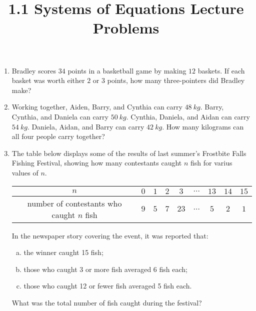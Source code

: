 \documentclass{article}
\title{1.1 Systems of Equations Lecture Problems}
\author{}
\date{}
\begin{document}
\maketitle

\begin{enumerate}
    \item Bradley scores $34$ points in a basketball game by making $12$ baskets.
        If each basket was worth either $2$ or $3$ points, how many three-pointers did Bradley make?
        \vspace{3cm}
    \item Working together, Aiden, Barry, and Cynthia can carry $\SI{48}{kg}$.
        Barry, Cynthia, and Daniela can carry $\SI{50}{kg}$.
        Cynthia, Daniela, and Aidan can carry $\SI{54}{kg}$.
        Daniela, Aidan, and Barry can carry $\SI{42}{kg}$.
        How many kilograms can all four people carry together?
        \vspace{3cm}
\item The table below displays some of the results of last summer's Frostbite Falls Fishing Festival, showing how many contestants caught $n$ fish for varius values of $n$.
    \begin{center}
        \begin{tabular}{|c|c|c|c|c|c|c|c|c|}
            \hline
            $n$ & $0$ & $1$ & $2$ & $3$ & $\dots$ & $13$ & $14$ & $15$ \\
            \hline
            number of contestants who caught $n$ fish & $9$ & $5$ & $7$ & $23$ & $\dots$ & $5$ & $2$ & $1$ \\
            \hline
        \end{tabular}
    \end{center}
    In the newspaper story covering the event, it was reported that:
    \begin{enumerate}[(a)]
        \item the winner caught 15 fish;
        \item those who caught 3 or more fish averaged 6 fish each;
        \item those who caught 12 or fewer fish averaged 5 fish each.
    \end{enumerate}
    What was the total number of fish caught during the festival?
\end{enumerate}
\end{document}
